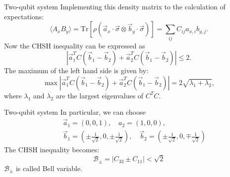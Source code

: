 \documentclass{beamer}
\begin{document}
    \begin{frame}{Two-qubit system}
        Implementing this density matrix to the calculation of expectations:
        \begin{equation*}
            \langle A_xB_y\rangle = \text{Tr}\left[\rho\left(\vec{a}_x\cdot \vec{\sigma}\otimes \vec{b}_y\cdot \vec{\sigma}\right)\right] = \sum_{ij}C_{ij}a_{x,i}b_{y,j}.
        \end{equation*}
        Now the CHSH inequality can be expressed as 
        \begin{equation*}
            \left|\vec{a}_1^TC\left(\vec{b}_1-\vec{b}_2\right)+\vec{a}_2^T C\left(\vec{b}_1-\vec{b}_2\right)\right|\leq 2.
        \end{equation*}
        The maximum of the left hand side is given by:
        \begin{equation*}
            \max \left|\vec{a}_1^TC\left(\vec{b}_1-\vec{b}_2\right)+\vec{a}_2^T C\left(\vec{b}_1-\vec{b}_2\right)\right| = 2\sqrt{\lambda_1+\lambda_2},
        \end{equation*}
        where $\lambda_1$ and $\lambda_2$ are the largest eigenvalues of $C^TC$.
        \begin{center}
            \footnotesize {}
        \end{center}
    \end{frame}

    \begin{frame}{Two-qubit system}
        In particular, we can choose 
        \begin{eqnarray}
            && \vec{a}_1 = (0, 0, 1), \quad a_2= (1,0,0), \nonumber \\
            && \vec{b}_1 = (\pm\frac{1}{\sqrt{2}}, 0, \pm\frac{1}{\sqrt{2}}), \quad \vec{b}_2 = (\pm\frac{1}{\sqrt{2}}, 0, \mp\frac{1}{\sqrt{2}}) \nonumber 
        \end{eqnarray}
        The CHSH inequality becomes:
        \begin{equation*}
            \mathcal{B}_{\pm}=\left|C_{33}\pm C_{11}\right| <\sqrt{2}
        \end{equation*}
        $\mathcal{B}_{\pm}$ is called Bell variable. 
        \begin{center}
            \footnotesize {}
        \end{center}
    \end{frame}
\end{document}
